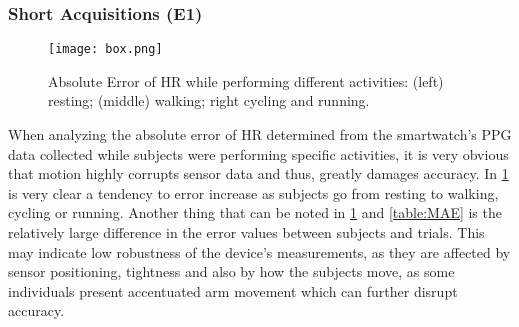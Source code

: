 \subsubsection{Short Acquisitions (E1)}


\begin{figure}[!h]
	\centering
	\texttt{[image: box.png]}
	\caption{Absolute Error of HR while performing different activities: (left) resting; (middle) walking; right cycling and running.}
	\label{figure:box}
\end{figure}


When analyzing the absolute error of HR determined from the smartwatch's PPG data collected while subjects were performing specific activities, it is very obvious that motion highly corrupts sensor data and thus, greatly damages accuracy. In \cref{figure:box} is very clear a tendency to error increase as subjects go from resting to walking, cycling or running.
Another thing that can be noted in \cref{figure:box} and \cref{table:MAE} is the relatively large difference in the error values between subjects and trials. This may indicate low robustness of the device's measurements, as they are affected by sensor positioning, tightness and also by how the subjects move, as some individuals present accentuated arm movement which can further disrupt accuracy.

